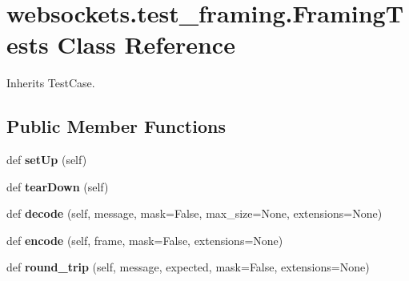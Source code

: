 \hypertarget{classwebsockets_1_1test__framing_1_1_framing_tests}{}\section{websockets.\+test\+\_\+framing.\+Framing\+Tests Class Reference}
\label{classwebsockets_1_1test__framing_1_1_framing_tests}


Inherits Test\+Case.

\subsection*{Public Member Functions}
\begin{DoxyCompactItemize}
\item 
\mbox{\label{classwebsockets_1_1test__framing_1_1_framing_tests_acfbe7e6c6a4c762ec4b1bb9f11d75e68}} 
def {\bfseries set\+Up} (self)
\item 
\mbox{\label{classwebsockets_1_1test__framing_1_1_framing_tests_a2b1fc8c0d206ae63040477673ed1b04b}} 
def {\bfseries tear\+Down} (self)
\item 
\mbox{\label{classwebsockets_1_1test__framing_1_1_framing_tests_a497b4b9dd5986a2174fb164a73f14548}} 
def {\bfseries decode} (self, message, mask=False, max\+\_\+size=None, extensions=None)
\item 
\mbox{\label{classwebsockets_1_1test__framing_1_1_framing_tests_a47f906a3e50869d636727c511fdc980a}} 
def {\bfseries encode} (self, frame, mask=False, extensions=None)
\item 
\mbox{\label{classwebsockets_1_1test__framing_1_1_framing_tests_adb5538eb65f57367d1d5ab56203785d1}} 
def {\bfseries round\+\_\+trip} (self, message, expected, mask=False, extensions=None)
\item 
\mbox{\label{classwebsockets_1_1test__framing_1_1_framing_tests_af0c0e0bb2d1f522b6139309c289b9837}} 

\end{DoxyCompactItemize}
